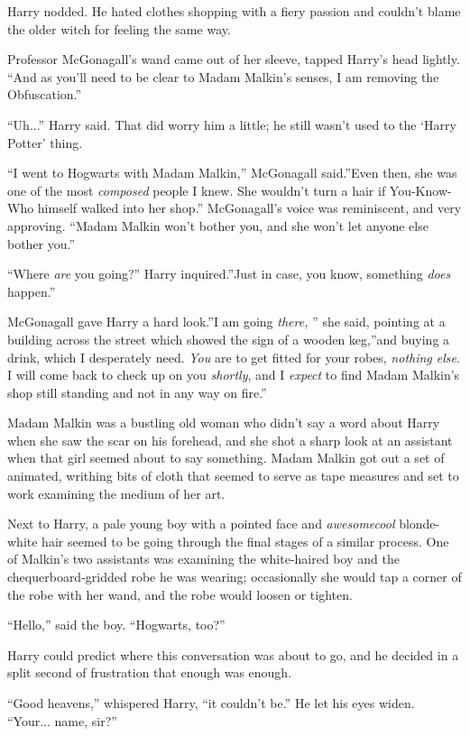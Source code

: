Harry nodded. He hated clothes shopping with a fiery passion and
couldn't blame the older witch for feeling the same way.

Professor McGonagall's wand came out of her sleeve, tapped Harry's head
lightly. ``And as you'll need to be clear to Madam Malkin's senses, I am
removing the Obfuscation.''

``Uh...'' Harry said. That did worry him a little; he still wasn't
used to the `Harry Potter' thing.

``I went to Hogwarts with Madam Malkin,'' McGonagall said.''Even then,
she was one of the most \emph{composed} people I knew. She wouldn't turn
a hair if You-Know-Who himself walked into her shop.'' McGonagall's
voice was reminiscent, and very approving. ``Madam Malkin won't bother
you, and she won't let anyone else bother you.''

``Where \emph{are} you going?'' Harry inquired.''Just in case, you know,
something \emph{does} happen.''

McGonagall gave Harry a hard look.''I am going \emph{there,} '' she said,
pointing at a building across the street which showed the sign of a
wooden keg,''and buying a drink, which I desperately need. \emph{You}
are to get fitted for your robes, \emph{nothing else}. I will come back
to check up on you \emph{shortly}, and I \emph{expect} to find Madam
Malkin's shop still standing and not in any way on fire.''

Madam Malkin was a bustling old woman who didn't say a word about Harry
when she saw the scar on his forehead, and she shot a sharp look at an
assistant when that girl seemed about to say something. Madam Malkin got
out a set of animated, writhing bits of cloth that seemed to serve as
tape measures and set to work examining the medium of her art.

Next to Harry, a pale young boy with a pointed face and
\emph{awesomecool} blonde-white hair seemed to be going through the
final stages of a similar process. One of Malkin's two assistants was
examining the white-haired boy and the chequerboard-gridded robe he was
wearing; occasionally she would tap a corner of the robe with her wand,
and the robe would loosen or tighten.

``Hello,'' said the boy. ``Hogwarts, too?''

Harry could predict where this conversation was about to go, and he
decided in a split second of frustration that enough was enough.

``Good heavens,'' whispered Harry, ``it couldn't be.'' He let his eyes
widen. ``Your... name, sir?''

